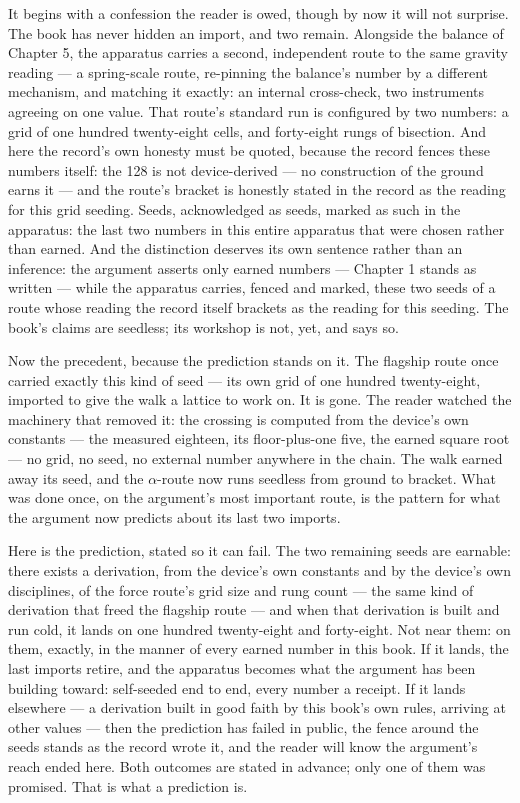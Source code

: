 It begins with a confession the reader is owed, though by now it will not surprise.
The book has never hidden an import, and two remain. Alongside the balance of
Chapter 5, the apparatus carries a second, independent route to the same gravity
reading --- a spring-scale route, re-pinning the balance's number by a different
mechanism, and matching it exactly: an internal cross-check, two instruments
agreeing on one value. That route's standard run is configured by two numbers: a
grid of one hundred twenty-eight cells, and forty-eight rungs of bisection. And
here the record's own honesty must be quoted, because the record fences these
numbers itself: the 128 is not device-derived --- no construction of the ground
earns it --- and the route's bracket is honestly stated in the record as the
reading for this grid seeding. Seeds, acknowledged as seeds, marked as such in
the apparatus: the last two numbers in this entire apparatus that were chosen
rather than earned. And the distinction deserves its own sentence rather than an
inference: the argument asserts only earned numbers --- Chapter 1 stands as
written --- while the apparatus carries, fenced and marked, these two seeds of a
route whose reading the record itself brackets as the reading for this seeding.
The book's claims are seedless; its workshop is not, yet, and says so.

Now the precedent, because the prediction stands on it. The flagship route once
carried exactly this kind of seed --- its own grid of one hundred twenty-eight,
imported to give the walk a lattice to work on. It is gone. The reader watched
the machinery that removed it: the crossing is computed from the device's own
constants --- the measured eighteen, its floor-plus-one five, the earned square
root --- no grid, no seed, no external number anywhere in the chain. The walk
earned away its seed, and the $\alpha$-route now runs seedless from ground to bracket.
What was done once, on the argument's most important route, is the pattern for
what the argument now predicts about its last two imports.

Here is the prediction, stated so it can fail. The two remaining seeds are
earnable: there exists a derivation, from the device's own constants and by the
device's own disciplines, of the force route's grid size and rung count --- the
same kind of derivation that freed the flagship route --- and when that
derivation is built and run cold, it lands on one hundred twenty-eight and
forty-eight. Not near them: on them, exactly, in the manner of every earned
number in this book. If it lands, the last imports retire, and the apparatus
becomes what the argument has been building toward: self-seeded end to end,
every number a receipt. If it lands elsewhere --- a derivation built in good
faith by this book's own rules, arriving at other values --- then the
prediction has failed in public, the fence around the seeds stands as the
record wrote it, and the reader will know the argument's reach ended here. Both
outcomes are stated in advance; only one of them was promised. That is what a
prediction is.


